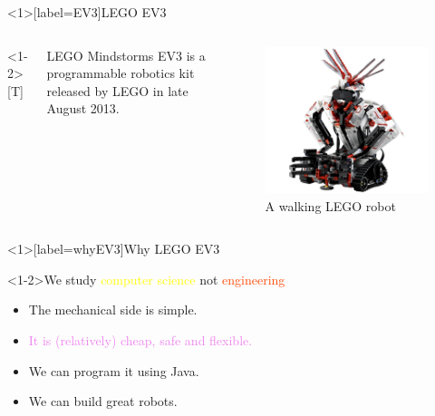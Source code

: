 \documentclass[color=pdftex,usenames,dvipsnames, aspectratio=169]{beamer}
\begin{document}
\begin{frame}<1>[label=EV3]{LEGO EV3\texttrademark}
\begin{columns}<1-2>[T]
\begin{column}{0.5\textwidth}
\begin{block}{}
LEGO Mindstorms EV3 is a programmable robotics kit released by LEGO in late August 2013.
\end{block}
\end{column}
\begin{column}{0.5\textwidth}
\begin{figure}
\includegraphics[width=\textwidth]{Images/EV3-Guy.jpeg}
\caption{A walking LEGO robot}
\end{figure}
\end{column}
\end{columns}
\end{frame}

\begin{frame}<1>[label=whyEV3]{Why LEGO EV3}

\begin{block}<1-2>{We study \textcolor{yellow}{computer science} not \textcolor{OrangeRed}{engineering}}

\begin{itemize}
\item \textcolor{OliveGreen}{The mechanical side is simple.}
\item \textcolor{violet}{It is (relatively) cheap, safe and flexible.}
\item \alert{We can program it using Java.}
\item We can build great robots.
\end{itemize}
\end{block}
\end{frame}
\end{document}
